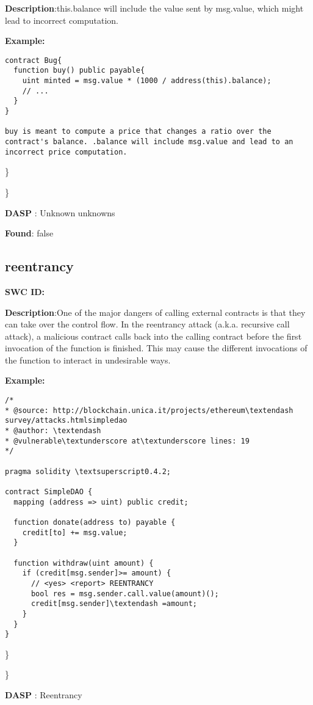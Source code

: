 \documentclass{article}
\begin{document}
\textbf{Description}:this.balance will include the value sent by msg.value, which might lead to incorrect computation.


\textbf{Example:} 
\begin{verbatim}
contract Bug{
  function buy() public payable{
    uint minted = msg.value * (1000 / address(this).balance);
    // ...
  }
}

buy is meant to compute a price that changes a ratio over the contract's balance. .balance will include msg.value and lead to an incorrect price computation.

\end{verbatim}\} 

\} 

\textbf{DASP} : Unknown unknowns

\textbf{Found}: false

\subsection{reentrancy} 
\textbf{SWC \textunderscore ID:} 

\textbf{Description}:One of the major dangers of calling external contracts is that they can take over the control flow. In the reentrancy attack (a.k.a. recursive call attack), a malicious contract calls back into the calling contract before the first invocation of the function is finished. This may cause the different invocations of the function to interact in undesirable ways.


\textbf{Example:} 
\begin{verbatim}
/*
* @source: http://blockchain.unica.it/projects/ethereum\textendash survey/attacks.htmlsimpledao
* @author: \textendash 
* @vulnerable\textunderscore at\textunderscore lines: 19
*/

pragma solidity \textsuperscript0.4.2;

contract SimpleDAO {
  mapping (address => uint) public credit;

  function donate(address to) payable {
    credit[to] += msg.value;
  }

  function withdraw(uint amount) {
    if (credit[msg.sender]>= amount) {
      // <yes> <report> REENTRANCY
      bool res = msg.sender.call.value(amount)();
      credit[msg.sender]\textendash =amount;
    }
  }
}

\end{verbatim}\} 

\} 

\textbf{DASP} : Reentrancy
\end{document}
